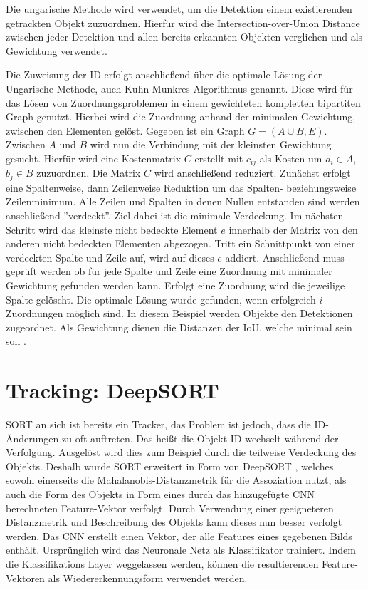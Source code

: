 \documentclass[conference]{IEEEtran}
\begin{document}
	Die ungarische Methode wird verwendet, um die Detektion einem existierenden getrackten Objekt zuzuordnen. Hierfür wird die Intersection-over-Union Distance zwischen jeder Detektion und allen bereits erkannten Objekten verglichen und als Gewichtung verwendet.
	
	Die Zuweisung der ID erfolgt anschließend über die optimale Lösung der Ungarische Methode, auch Kuhn-Munkres-Algorithmus genannt. Diese wird für das Lösen von Zuordnungsproblemen in einem gewichteten kompletten bipartiten Graph genutzt. Hierbei wird die Zuordnung anhand der minimalen Gewichtung, zwischen den Elementen gelöst. Gegeben ist ein Graph $G = (A \cup B, E) $. Zwischen $A$ und $B$ wird nun die Verbindung mit der kleinsten Gewichtung gesucht. Hierfür wird eine Kostenmatrix $C$ erstellt mit $c_{ij}$ als Kosten um $a_i \in A$, $b_j \in B$ zuzuordnen. Die Matrix $C$ wird anschließend reduziert. 
	Zunächst erfolgt eine Spaltenweise, dann Zeilenweise Reduktion um das Spalten- beziehungsweise Zeilenminimum. Alle Zeilen und Spalten in denen Nullen entstanden sind werden anschließend ''verdeckt''. Ziel dabei ist die minimale Verdeckung. Im nächsten Schritt wird das kleinste nicht bedeckte Element $e$ innerhalb der Matrix von den anderen nicht bedeckten Elementen abgezogen. Tritt ein Schnittpunkt von einer verdeckten Spalte und Zeile auf, wird auf dieses $e$ addiert. Anschließend muss geprüft werden ob für jede Spalte und Zeile eine Zuordnung mit minimaler Gewichtung gefunden werden kann. Erfolgt eine Zuordnung wird die jeweilige Spalte gelöscht. Die optimale Lösung wurde gefunden, wenn erfolgreich $i$ Zuordnungen möglich sind.
	In diesem Beispiel werden Objekte den Detektionen zugeordnet. Als Gewichtung dienen die Distanzen der IoU, welche minimal sein soll \cite{hungarian}.
	 
	\section{Tracking: DeepSORT}
	
	SORT an sich ist bereits ein Tracker, das Problem ist jedoch, dass die ID-Änderungen zu oft auftreten. Das heißt die Objekt-ID wechselt während der Verfolgung. Ausgelöst wird dies zum Beispiel durch die teilweise Verdeckung des Objekts. Deshalb wurde SORT erweitert in Form von DeepSORT \cite{deepSort}, welches sowohl einerseits die Mahalanobis-Distanzmetrik für die Assoziation nutzt, als auch die Form des Objekts in Form eines durch das hinzugefügte CNN berechneten Feature-Vektor verfolgt. Durch Verwendung einer geeigneteren Distanzmetrik und Beschreibung des Objekts kann dieses nun besser verfolgt werden.
	Das CNN erstellt einen Vektor, der alle Features eines gegebenen Bilds enthält. Ursprünglich wird das Neuronale Netz als Klassifikator trainiert. Indem die Klassifikations Layer weggelassen werden, können die resultierenden Feature-Vektoren als Wiedererkennungsform verwendet werden.
	
\end{document}
